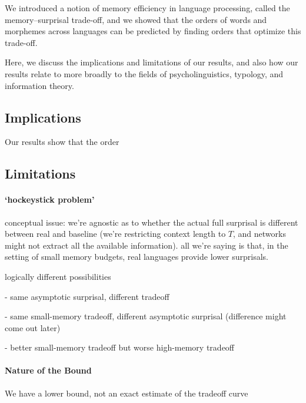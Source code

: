 We introduced a notion of memory efficiency in language processing, called the memory--surprisal trade-off, and we showed that the orders of words and morphemes across languages can be predicted by finding orders that optimize this trade-off. 

Here, we discuss the implications and limitations of our results, and also how our results relate to more broadly to the fields of psycholinguistics, typology, and information theory.





\subsection{Implications}
Our results show that the order 


\subsection{Limitations}


\paragraph{`hockeystick problem'} conceptual issue: we're agnostic as to whether the actual full surprisal is different between real and baseline (we're restricting context length to $T$, and networks might not extract all the available information). all we're saying is that, in the setting of small memory budgets, real languages provide lower surprisals.

logically different possibilities

- same asymptotic surprisal, different tradeoff

- same small-memory tradeoff, different asymptotic surprisal (difference might come out later)

- better small-memory tradeoff but worse high-memory tradeoff

\paragraph{Nature of the Bound}
We have a lower bound, not an exact estimate of the tradeoff curve

